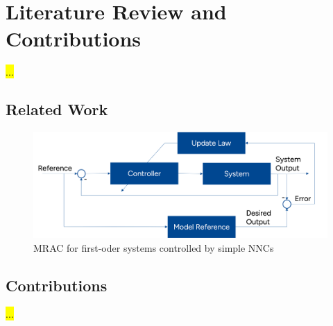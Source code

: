 \section{Literature Review and Contributions}
\hl{...}
\subsection{Related Work}

\begin{figure}[ht]
    \centering
    \includegraphics[width=0.8\linewidth]{images/MRAC_Blockdiagram.png}
    \caption{MRAC for first-oder systems controlled by simple NNCs}
    \label{fig:nonlinear-NNC-MRAC}
\end{figure}

\subsection{Contributions}
\hl{...}